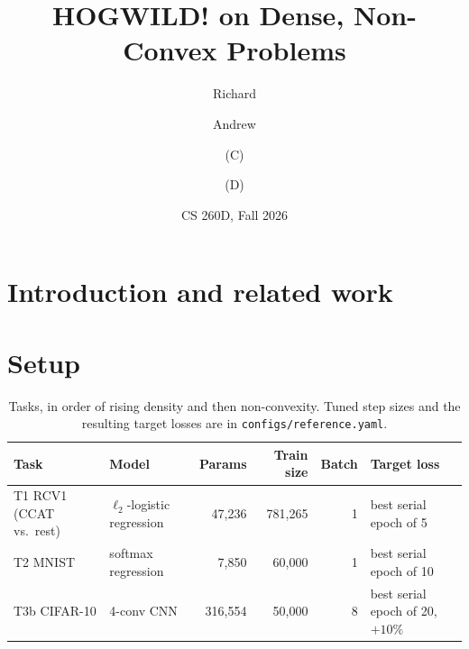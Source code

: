 \documentclass[11pt]{article}
\title{HOGWILD! on Dense, Non-Convex Problems}
\author{Richard \and Andrew \and (C) \and (D)}   %
\date{CS 260D, Fall 2026}
\begin{document}
\maketitle

\begin{abstract}
\end{abstract}

\section{Introduction and related work}  %

\section{Setup}  %

\begin{table}[h]\centering\small
\begin{tabular}{llrrrl}
\toprule
Task & Model & Params & Train size & Batch & Target loss \\
\midrule
T1 RCV1 (CCAT vs.\ rest) & $\ell_2$-logistic regression & 47{,}236 & 781{,}265 & 1 & best serial epoch of 5 \\
T2 MNIST & softmax regression & 7{,}850 & 60{,}000 & 1 & best serial epoch of 10 \\
T3b CIFAR-10 & 4-conv CNN & 316{,}554 & 50{,}000 & 8 & best serial epoch of 20, $+10\%$ \\
\bottomrule
\end{tabular}
\caption{Tasks, in order of rising density and then non-convexity. Tuned step
sizes and the resulting target losses are in \texttt{configs/reference.yaml}.}
\label{tab:tasks}
\end{table}
\end{document}
